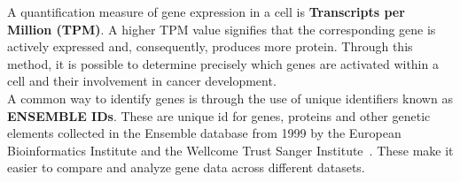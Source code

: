 A quantification measure of gene expression in a cell is \textbf{Transcripts per Million (TPM)}.
A higher TPM value signifies that the corresponding gene is actively expressed and, consequently, produces more protein.
Through this method, it is possible to determine precisely which genes are activated within a cell and
their involvement in cancer development.
\\

A common way to identify genes is through the use of unique identifiers known as \textbf{ENSEMBLE IDs}.
These are unique id for genes, proteins and other genetic elements collected in the Ensemble database
from 1999 by the European Bioinformatics Institute and the Wellcome Trust Sanger Institute~\cite{ensembl_project}.
These make it easier to compare and analyze gene data across different datasets.
\\

